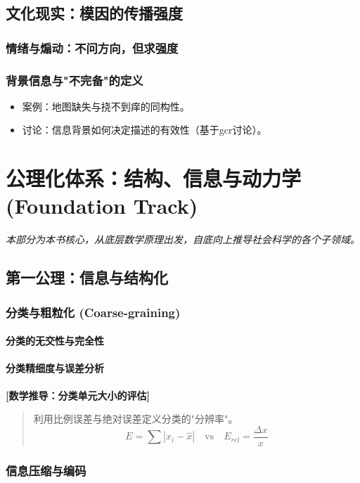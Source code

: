 \documentclass[openany]{book} %
\newenvironment{derivation}[1][数学推导与模型细节]{
	\par\vspace{1em}\noindent\textbf{\color{darkgray} [#1]} \itshape \small
	\begin{quote}\color{gray}
	}{
	\end{quote}\par\vspace{1em}
}
\begin{document}
	\chapter{文化现实：模因的传播强度}
	\section{情绪与煽动：不问方向，但求强度}
	\section{背景信息与"不完备"的定义}
	\begin{itemize}
		\item 案例：地图缺失与挠不到痒的同构性。
		\item 讨论：信息背景如何决定描述的有效性（基于gcr讨论）。
	\end{itemize}

	\part{公理化体系：结构、信息与动力学 (Foundation Track)}
	\vspace{2em}
	\textit{本部分为本书核心，从底层数学原理出发，自底向上推导社会科学的各个子领域。}

	\chapter{第一公理：信息与结构化}
	\label{chap:info_theory}
	\section{分类与粗粒化 (Coarse-graining)}
	\subsection{分类的无交性与完全性}
	\subsection{分类精细度与误差分析}
	\begin{derivation}[数学推导：分类单元大小的评估]
		利用比例误差与绝对误差定义分类的"分辨率"。
		$$ E = \sum |x_i - \hat{x}| \quad \text{vs} \quad E_{rel} = \frac{\Delta x}{x} $$
	\end{derivation}

	\section{信息压缩与编码}
\end{document}
